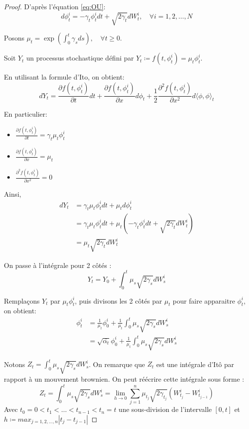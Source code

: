 \documentclass[a4paper,10pt]{article}
\theoremstyle{definition} %
\theoremstyle{definition} %
\theoremstyle{definition} %
\theoremstyle{definition} %
\begin{document}
\begin{proof}
    D'après l'équation \eqref{eq:OU}:
    \[d\phi_t^i = -\gamma_t \phi_t^i dt + \sqrt{2\gamma_t}dW_t^i, \quad \forall i=1,2,\dots,N\] 
    
    Posons $\mu_t = \exp{\left(\int_0^t \gamma_s ds\right)}, \quad \forall t \geq 0$.
    
    Soit $Y_t$ un processus stochastique défini par $Y_t \coloneqq f(t,\phi_t^i)= \mu_t \phi_t^i$.
    
    En utilisant la formule d'Ito, on obtient:
    \[dY_t = \frac{\partial f(t,\phi_t^i)}{\partial t} dt + \frac{\partial f(t,\phi_t^i)}{\partial x} d\phi_t + \frac{1}{2}\frac{\partial^2f(t,\phi_t^i)}{\partial x^2}d\langle\phi,\phi\rangle_t\]

    En particulier:
    \begin{itemize}
        \item $\frac{\partial f(t,\phi_t^i)}{\partial t} = \gamma_t \mu_t \phi_t^i$
        \item $\frac{\partial f(t,\phi_t^i)}{\partial x} = \mu_t$
        \item $\frac{\partial^2f(t,\phi_t^i)}{\partial x^2}=0$
    \end{itemize}

    Ainsi,
    \begin{align*}
        dY_t &= \gamma_t \mu_t \phi_t^i dt + \mu_t d\phi_t^i\\
        &= \gamma_t \mu_t \phi_t^i dt + \mu_t (-\gamma_t \phi_t^i dt + \sqrt{2\gamma_t}dW_t^i)\\
        &= \mu_t\sqrt{2\gamma_t}dW_t^i
    \end{align*}
    
    On passe à l'intégrale pour 2 côtés :
    \[Y_t = Y_0 + \int_0^t \mu_s\sqrt{2\gamma_s}dW_s^i\]

    Remplaçons $Y_t$ par $\mu_t \phi_t^i$, puis divisons les 2 côtés par $\mu_t$ pour faire apparaitre $\phi_t^i$, on obtient:
    \begin{align*}
        \phi_t^i &= \frac{1}{\mu_t}\phi_0^i + \frac{1}{\mu_t} \int_0^t \mu_s\sqrt{2\gamma_s}dW_s^i \\
        &= \sqrt{\bar{\alpha_t}}\phi_0^i + \frac{1}{\mu_t} \int_0^t \mu_s\sqrt{2\gamma_s}dW_s^i
    \end{align*}

    Notons $Z_t = \int_0^t\mu_s\sqrt{2\gamma_s}dW_s^i$. On remarque que $Z_t$ est une intégrale d'Itô par rapport à un mouvement brownien. On peut réécrire cette intégrale sous forme :
    \[Z_t=\int_0^t\mu_s\sqrt{2\gamma_s}dW_s^i = \lim_{h\rightarrow 0} \sum_{j=1}^{n} \mu_{t_j}\sqrt{2\gamma_{t_j}}(W^i_{t_j}-W^i_{t_{j-1}})\]
    Avec $t_0=0 < t_1<\dots<t_{n-1} < t_{n} = t$ une sous-division de l'intervalle $[0,t]$ et $h \coloneqq max_{j = 1,2,\dots,n} |t_j - t_{j-1}|$


\end{proof}
\end{document}
